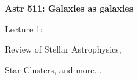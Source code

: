 \documentclass[letterpaper,landscape]{slides}
\begin{document}
\newcommand{\palV}[2]{
\begin{slide}
\begin{minipage}{8in}
~\vskip-1in
\rotatebox{0}{\scalebox{0.85}{\texttt{[image: figures/\#1]}}}
\vskip -2.5in~
\end{minipage}

#2

\vfill
\end{slide}
}


\begin{slide}

\phantom{x}
\vskip -2in
\begin{center}
\bfseries
{\large {\color{blue} Astr 511: Galaxies as galaxies}}
\end{center}



{\centerline {\huge {\color{red}      Lecture 1:             }}}
\vskip 0.2in 
{\centerline {\Large {\color{blue} Review of Stellar Astrophysics,    }}}
{\centerline {\Large {\color{blue}   Star Clusters, and more...       }}}

\vfill
\end{slide}


 
%
%
%
%
%
%
%
\end{document}
